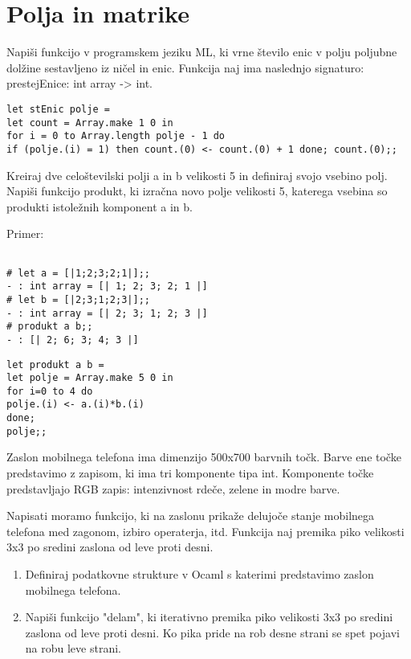 \section{Polja in matrike}


\begin{ex} 
Napi\v si funkcijo v programskem jeziku ML, ki vrne \v stevilo enic v polju poljubne dol\v zine sestavljeno iz ni\v cel in enic. Funkcija naj ima naslednjo signaturo: prestejEnice: int array -> int.

\begin{sol}
\begin{verbatim}
let stEnic polje = 
let count = Array.make 1 0 in
for i = 0 to Array.length polje - 1 do 
if (polje.(i) = 1) then count.(0) <- count.(0) + 1 done; count.(0);;
\end{verbatim}
\end{sol}

\end{ex}
\begin{ex}
Kreiraj dve celo\v stevilski polji a in b velikosti 5 in definiraj svojo vsebino polj. Napi\v si funkcijo produkt, ki izra\v cna novo polje velikosti 5, katerega vsebina so produkti istole\v znih komponent a in b.

Primer: \begin{verbatim}

# let a = [|1;2;3;2;1|];;
- : int array = [| 1; 2; 3; 2; 1 |]
# let b = [|2;3;1;2;3|];;
- : int array = [| 2; 3; 1; 2; 3 |]
# produkt a b;; 
- : [| 2; 6; 3; 4; 3 |]
\end{verbatim}

\begin{sol}
\begin{verbatim}
let produkt a b = 
let polje = Array.make 5 0 in
for i=0 to 4 do
polje.(i) <- a.(i)*b.(i)
done;
polje;;
\end{verbatim}
\end{sol}


\end{ex}
\begin{ex}
Zaslon mobilnega telefona ima dimenzijo 500x700 barvnih to\v ck. Barve ene to\v cke predstavimo z zapisom, ki ima tri komponente tipa int. Komponente to\v cke predstavljajo RGB zapis: intenzivnost rde\v ce, zelene in modre barve. 

Napisati moramo funkcijo, ki na zaslonu prika\v ze delujo\v ce stanje mobilnega telefona med zagonom, izbiro operaterja, itd. Funkcija naj premika piko velikosti 3x3 po sredini zaslona od leve proti desni. 

\begin{enumerate}
\item  Definiraj podatkovne strukture v Ocaml s katerimi predstavimo zaslon mobilnega telefona.
\item  Napi\v si funkcijo "delam", ki iterativno premika piko velikosti 3x3 po sredini zaslona od leve proti desni. Ko pika pride na rob desne strani se spet pojavi na robu leve strani.
\end{enumerate}

\end{ex}
